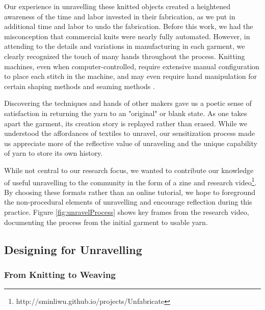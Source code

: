 
Our experience in unravelling these knitted objects created a heightened awareness of the time and labor invested in their fabrication, as we put in additional time and labor to undo the fabrication. Before this work, we had the misconception that commercial knits were nearly fully automated. However, in attending to the details and variations in manufacturing in each garment, we clearly recognized the touch of many hands throughout the process. Knitting machines, even when computer-controlled, require extensive manual configuration to place each stitch in the machine, and may even require hand manipulation for certain shaping methods and seaming methods \cite{rowan_machineknitting}.

Discovering the techniques and hands of other makers gave us a poetic sense of satisfaction in returning the yarn to an "original" or blank state. As one takes apart the garment, its creation story is replayed rather than erased. While we understood the affordances of textiles to unravel, our sensitization process made us appreciate more of the reflective value of unraveling and the unique capability of yarn to store its own history. 

While not central to our research focus, we wanted to contribute our knowledge of useful unravelling to the community in the form of a zine and research video\footnote{http://sminliwu.github.io/projects/Unfabricate}. By choosing these formats rather than an online tutorial, we hope to foreground the non-procedural elements of unravelling and encourage reflection during this practice. Figure \ref{fig:unravelProcess} shows key frames from the research video, documenting the process from the initial garment to usable yarn.  

\subsection{Designing for Unravelling}

\subsubsection{From Knitting to Weaving}

